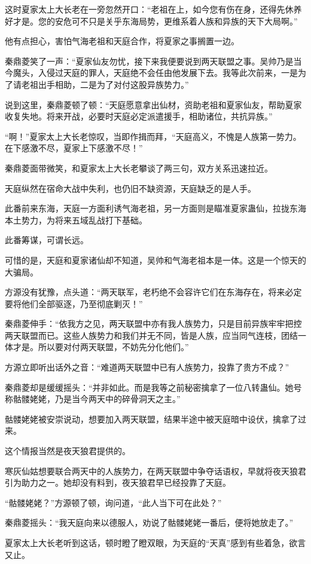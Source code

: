 \begin{this_body}
这时夏家太上大长老在一旁忽然开口：“老祖在上，如今您有伤在身，还得先休养好才是。您的安危可不只是关乎东海局势，更维系着人族和异族的天下大局啊。”

他有点担心，害怕气海老祖和天庭合作，将夏家之事搁置一边。

秦鼎菱笑了一声：“夏家仙友勿忧，接下来我便要说到两天联盟之事。吴帅乃是当今魔头，入侵过天庭的罪人，天庭绝不会任由他发展下去。我等此次前来，一是为了请老祖出手相助，二是为了对付这股异族势力。”

说到这里，秦鼎菱顿了顿：“天庭愿意拿出仙材，资助老祖和夏家仙友，帮助夏家收复失地。将来开战，必要时天庭必定派遣援手，相助诸位，共抗异族。”

“啊！”夏家太上大长老惊叹，当即作揖而拜，“天庭高义，不愧是人族第一势力。在下感激不尽，夏家上下感激不尽！”

秦鼎菱面带微笑，和夏家太上大长老攀谈了两三句，双方关系迅速拉近。

天庭纵然在宿命大战中失利，也仍旧不缺资源，天庭缺乏的是人手。

此番前来东海，天庭一方面利诱气海老祖，另一方面则是瞄准夏家蛊仙，拉拢东海本土势力，为将来五域乱战打下基础。

此番筹谋，可谓长远。

可惜的是，天庭和夏家诸仙却不知道，吴帅和气海老祖本是一体。这是一个惊天的大骗局。

方源没有犹豫，点头道：“两天联军，老朽绝不会容许它们在东海存在，将来必定要将他们全部驱逐，乃至彻底剿灭！”

秦鼎菱伸手：“依我方之见，两天联盟中亦有我人族势力，只是目前异族牢牢把控两天联盟而已。这些人族势力和我们并无不同，皆是人族，应当同气连枝，团结一体才是。所以要对付两天联盟，不妨先分化他们。”

方源立即听出话外之音：“难道两天联盟中已有人族势力，投靠了贵方不成？”

秦鼎菱却是缓缓摇头：“并非如此。而是我等之前秘密擒拿了一位八转蛊仙。她号称骷髅姥姥，乃是当今两天中的碎骨洞天之主。”

骷髅姥姥被安崇说动，想要加入两天联盟，结果半途中被天庭暗中设伏，擒拿了过来。

这个情报当然是夜天狼君提供的。

寒灰仙姑想要联合两天中的人族势力，在两天联盟中争夺话语权，早就将夜天狼君引为助力之一。她却没有料到，夜天狼君早已经投靠了天庭。

“骷髅姥姥？”方源顿了顿，询问道，“此人当下可在此处？”

秦鼎菱摇头：“我天庭向来以德服人，劝说了骷髅姥姥一番后，便将她放走了。”

夏家太上大长老听到这话，顿时瞪了瞪双眼，为天庭的“天真”感到有些着急，欲言又止。


\end{this_body}
